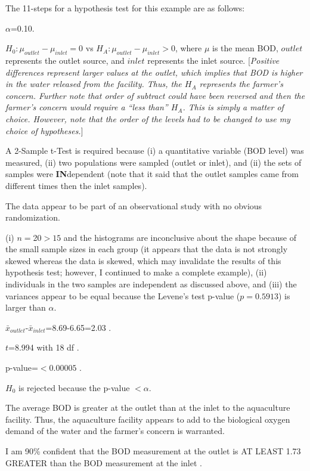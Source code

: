 \documentclass[10pt,openany]{book}\usepackage[]{graphicx}\usepackage[]{color}
\begin{document}
The 11-steps  for a hypothesis test for this example are as follows:
  \begin{Enumerate}
    \item $\alpha$=0.10.
    \item $H_{0}:\mu_{outlet}-\mu_{inlet}=0$ vs $H_{A}:\mu_{outlet}-\mu_{inlet}>0$, where $\mu$ is the mean BOD, $outlet$ represents the outlet source, and $inlet$ represents the inlet source. [\textit{Positive differences represent larger values at the outlet, which implies that BOD is higher in the water released from the facility. Thus, the $H_{A}$ represents the farmer's concern. Further note that order of subtract could have been reversed and then the farmer's concern would require a ``less than'' $H_{A}$. This is simply a matter of choice. However, note that the order of the levels had to be changed to use my choice of hypotheses.}]
    \item A 2-Sample t-Test is required because (i) a quantitative variable (BOD level) was measured, (ii) two populations were sampled (outlet or inlet), and (ii) the sets of samples were \textbf{IN}dependent (note that it said that the outlet samples came from different times then the inlet samples).
    \item The data appear to be part of an observational study with no obvious randomization.
    \item (i) $n=$20$>15$ and the histograms  are inconclusive about the shape because of the small sample sizes in each group (it appears that the  data is not strongly skewed whereas the  data is skewed, which may invalidate the results of this hypothesis test; however, I continued to make a complete example), (ii) individuals in the two samples are independent as discussed above, and (iii) the variances appear to be equal because the Levene's test p-value ($p=0.5913$) is larger than $\alpha$.
    \item $\bar{x}_{outlet}$-$\bar{x}_{inlet}$=8.69-6.65=2.03 .
    \item $t$=8.994 with 18 df .
    \item p-value=$<0.00005$ .
    \item $H_{0}$ is rejected because the p-value $<\alpha$.
    \item The average BOD is greater at the outlet than at the inlet to the aquaculture facility.  Thus, the aquaculture facility appears to add to the biological oxygen demand of the water and the farmer's concern is warranted.
    \item I am 90\% confident that the BOD measurement at the outlet is AT LEAST 1.73 GREATER than the BOD measurement at the inlet .
  \end{Enumerate}
\end{document}
